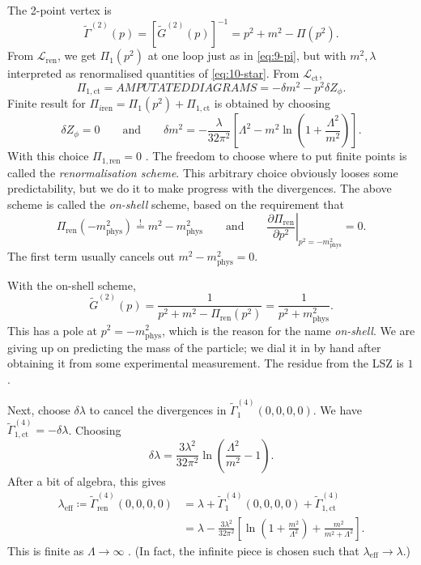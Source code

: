 The 2-point vertex is
\begin{equation}
  \widetilde{\Gamma}^{(2)}(p) = [\widetilde{G}^{(2)}(p)]^{-1} = p^2 + m^2 - \Pi(p^2).
\end{equation}
From $\mathscr{L}_{\text{ren}}$, we get $\Pi_1(p^2)$ at one loop just as in \eqref{eq:9-pi}, but with $m^2, \lambda$ interpreted as renormalised quantities of \eqref{eq:10-star}.
From $\mathscr{L}_{\text{ct}}$, 
\begin{equation}
  \Pi_{1, \text{ct}} = AMPUTATED DIAGRAMS = - \delta m^2 - p^2 \delta Z_\phi.
\end{equation}
Finite result for $\Pi_{i \text{ren}} = \Pi_1(p^2) + \Pi_{1, \text{ct}}$  is obtained by choosing
 \begin{equation}
  \delta Z_\phi = 0 \qquad \text{and} \qquad \delta m^2 = -\frac{\lambda}{32 \pi^2} \left[ \Lambda^2 - m^2 \ln(1 + \frac{\Lambda^2}{m^2}) \right].
\end{equation}
With this choice $\Pi_{1, \text{ren}} = 0$ .
The freedom to choose where to put finite points is called the \emph{renormalisation scheme}.
This arbitrary choice obviously looses some predictability, but we do it to make progress with the divergences.
The above scheme is called the \emph{on-shell} scheme, based on the requirement that
\begin{equation}
  \Pi_{\text{ren}}(-m^2_{\text{phys}}) \stackrel{!}{=} m^2 - m^2_{\text{phys}} \qquad \text{and} \qquad
  \left.\frac{\partial \Pi_{\text{ren}}}{\partial p^2}\right\rvert_{p^2 = -m^2_{\text{phys}}} = 0.
\end{equation}
The first term usually cancels out $m^2 - m^2_{\text{phys}} = 0$.

With the on-shell scheme, 
\begin{equation}
  \widetilde{G}^{(2)}(p) = \frac{1}{p^2+ m^2 - \Pi_{\text{ren}}(p^2)} = \frac{1}{p^2 + m^2_{\text{phys}}}.
\end{equation}
This has a pole at $p^2 = -m^2_{\text{phys}}$, which is the reason for the name \emph{on-shell}.
We are giving up on predicting the mass of the particle; we dial it in by hand after obtaining it from some experimental measurement.
The residue from the LSZ is $1$.

Next, choose $\delta \lambda$ to cancel the divergences in $\widetilde{\Gamma}_1^{(4)}(0,0,0,0)$.
We have $\widetilde\Gamma_{1, \text{ct}}^{(4)} = -\delta \lambda$. Choosing
\begin{equation}
  \delta \lambda = \frac{3 \lambda^2}{32 \pi^2} \ln(\frac{\Lambda^2}{m^2} - 1).
\end{equation}
After a bit of algebra, this gives
\begin{align}
  \lambda_{\text{eff}} \coloneqq \widetilde{\Gamma}_{\text{ren}}^{(4)}(0,0,0,0) &= \lambda + \widetilde{\Gamma}_1^{(4)}(0,0,0,0) + \widetilde{\Gamma}_{1, \text{ct}}^{(4)} \\
										&= \lambda - \frac{3\lambda^2}{32 \pi^2} \left[ \ln(1 + \frac{m^2}{\Lambda^2}) + \frac{m^2}{m^2 + \Lambda^2} \right].
\end{align}
This is finite as $\Lambda \to \infty$ . (In fact, the infinite piece is chosen such that $\lambda_{\text{eff}} \to \lambda$.)


